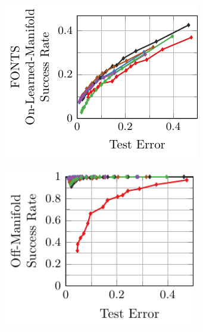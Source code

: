 \begin{appendix}
\begin{figure}
\begin{subfigure}{0.225\textwidth}
    \end{subfigure}
    \\
    \begin{subfigure}{0.245\textwidth}
        \centering
        \includegraphics[width=\textwidth]{appendix_vgg2_fonts_error_on_learned.pdf}
    \end{subfigure}
    \begin{subfigure}{0.225\textwidth}
        \centering
        \includegraphics[width=0.925\textwidth]{appendix_vgg2_fonts_error_off.pdf}
    \end{subfigure}
    \\
    \begin{subfigure}{0.245\textwidth}

\end{subfigure}
\end{figure}
\end{appendix}
